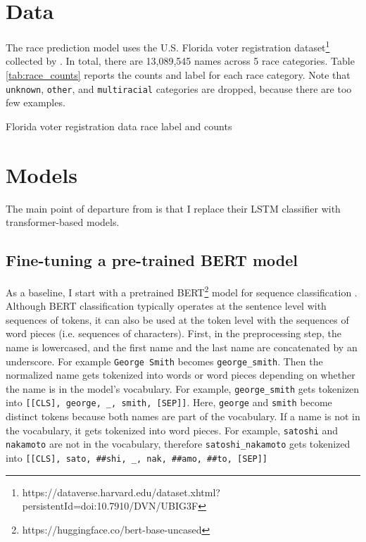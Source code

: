 \documentclass[11pt]{article}
\begin{document}
\section{Data}
The race prediction model uses the U.S. Florida voter registration dataset\footnote{https://dataverse.harvard.edu/dataset.xhtml?persistentId=doi:10.7910/DVN/UBIG3F} collected by \textcite{sood_predicting_2018}.
In total, there are 13,089,545 names across 5 race categories.
Table \ref{tab:race_counts} reports the counts and label for each race category.
Note that \texttt{unknown}, \texttt{other}, and \texttt{multiracial} categories are dropped, because there are too few examples.

\begin{table}[H]
 \centering
 
 \caption{Florida voter registration data race label and counts}
 \label{tab:race_counts}
\end{table}

\section{Models}
The main point of departure from \textcite{sood_predicting_2018} is that I replace their LSTM classifier with transformer-based models.

\subsection{Fine-tuning a pre-trained BERT model}

As a baseline, I start with a pretrained BERT\footnote{https://huggingface.co/bert-base-uncased} model for sequence classification \parencite{vaswani_attention_2017,devlin_bert_2019}.
Although BERT classification typically operates at the sentence level with sequences of tokens, it can also be used at the token level with the sequences of word pieces (i.e. sequences of characters).
First, in the preprocessing step, the name is lowercased, and the first name and the last name are concatenated by an underscore.
For example \texttt{George Smith} becomes \texttt{george\_smith}.
Then the normalized name gets tokenized into words or word pieces depending on whether the name is in the model's vocabulary. 
For example, \texttt{george\_smith} gets tokenizen into \texttt{{[[CLS], george, \_, smith, [SEP]]}}.
Here, \texttt{george} and \texttt{smith} become distinct tokens because both names are part of the vocabulary. 
If a name is not in the vocabulary, it gets tokenized into word pieces. 
For example, \texttt{satoshi} and \texttt{nakamoto} are not in the vocabulary, therefore \texttt{satoshi\_nakamoto} gets tokenized into \texttt{[[CLS], sato, \#\#shi, \_, nak, \#\#amo, \#\#to, [SEP]]}
\end{document}
